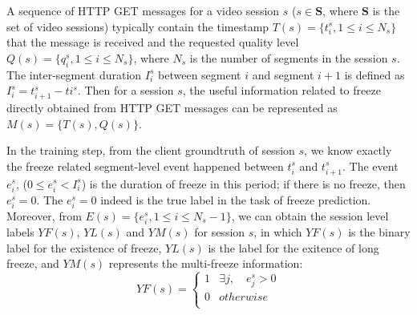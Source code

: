 \documentclass[journal]{IEEEtran}
\begin{document}
%
%
%

A sequence of HTTP GET messages for a video session $s$ ($s\in{\mathbf{S}}$, where $\mathbf{S}$ is the set of video sessions) typically contain the timestamp $T(s)=\{t_i^s, 1\leq{i}\leq{N_s}\}$ that the message is received and the requested quality level $Q(s)=\{q_i^s, 1\leq{i}\leq{N_s}\}$, where $N_s$ is the number of segments in the session $s$. The inter-segment duration $I_i^s$ between segment $i$ and segment $i+1$ is defined as $I_i^s=t_{i+1}^s-t{i}^s$. Then for a session $s$, the useful information related to freeze directly obtained from HTTP GET messages can be represented as $M(s)=\{T(s),Q(s)\}$.

In the training step, from the client groundtruth of session $s$, we know exactly the freeze related segment-level event happened between $t_i^s$ and $t_{i+1}^s$. The event $e_i^s$, ($0\leq{e_i^s}<I_i^s$) is the duration of freeze in this period; if there is no freeze, then $e_i^s=0$. The $e_i^s=0$ indeed is the true label in the task of freeze prediction. Moreover, from $E(s)=\{e_i^s,1\leq{i}\leq{N_s}-1\}$, we can obtain the session level labels $YF(s)$, $YL(s)$ and $YM(s)$ for session $s$, in which $YF(s)$ is the binary label for the existence of freeze, $YL(s)$ is the label for the exitence of long freeze, and $YM(s)$ represents the multi-freeze information:
\begin{equation}
YF(s) =
  \begin{cases}
    1       & \exists{j},\quad e_j^s>0 \\
    0  		& otherwise\\
  \end{cases}
\end{equation}
\end{document}
